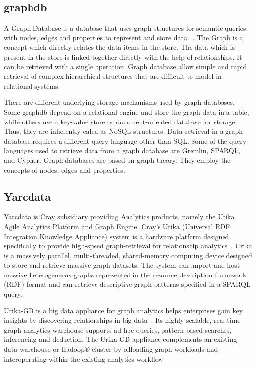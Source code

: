      \pv

     
\subsection{graphdb}

A Graph Database is a database that uses graph structures for semantic
queries with nodes, edges and properties to represent and store data
~\cite{www-graphdb}. The Graph is a concept which directly relates the
data items in the store.  The data which is present in the store is
linked together directly with the help of relationships. It can be
retrieved with a single operation.  Graph database allow simple and
rapid retrieval of complex hierarchical structures that are difficult
to model in relational systems.

     There are different underlying storage mechanisms used by graph
     databases.  Some graphdb depend on a relational engine and store
     the graph data in a table, while others use a key-value store or
     document-oriented database for storage. Thus, they are inherently
     caled as NoSQL structures.  Data retrieval in a graph database
     requires a different query language other than SQL. Some of the
     query languages used to retrieve data from a graph database are
     Gremlin, SPARQL, and Cypher.  Graph databases are based on graph
     theory. They employ the concepts of nodes, edges and properties.

     \pv
     
\subsection{Yarcdata \cv}

Yarcdata is Cray subsidiary providing Analytics products, namely the
Urika Agile Analytics Platform and Graph Engine. Cray’s Urika
(Universal RDF Integration Knowledge Appliance) system is a hardware
platform designed specifically to provide high-speed graph-retrieval
for relationship analytics~\cite{www-Urika-appliance}.  Urika is a
massively parallel, multi-threaded, shared-memory computing device
designed to store and retrieve massive graph datasets. The system can
import and host massive heterogeneous graphs represented in the
resource description framework (RDF) format and can retrieve
descriptive graph patterns specified in a SPARQL query.

Urika-GD is a big data appliance for graph analytics helps enterprises
gain key insights by discovering relationships in big
data~\cite{techspec-Urika-GD}.  Its highly scalable, real-time graph
analytics warehouse supports ad hoc queries, pattern-based searches,
inferencing and deduction. The Urika-GD appliance complements an
existing data warehouse or Hadoop® cluster by offloading graph
workloads and interoperating within the existing analytics workflow

